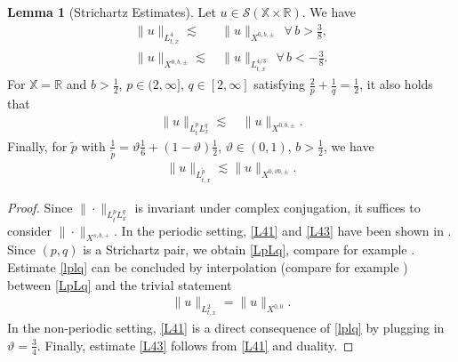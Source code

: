 \documentclass[reqno]{amsart}
\theoremstyle{Definitionl}
\theoremstyle{Definitionk}
\theoremstyle{definition}
\theoremstyle{Satzk}
\theoremstyle{Satzl}
\newtheorem{lemmal}[defi]{Lemma}
\theoremstyle{Bemerkung}
\begin{document}
\begin{lemmal}[Strichartz Estimates]
Let $u\in\mathcal S(\mathbb X\times\mathbb R)$. We have
\begin{align}
\|u\|_{L^4_{t,x}}\lesssim&\, \|u\|_{X^{0,b,\pm}}\ \ \forall\,b>\frac38,\label{L41}\\
\|u\|_{X^{0,b,\pm}}\lesssim&\, \|u\|_{L^{4/3}_{t,x}}\ \ \forall\,b<-\frac38\label{L43}.
\end{align}
For $\mathbb X=\mathbb R$ and $b>\tfrac12$, $p\in(2,\infty]$, $q\in[2,\infty]$ satisfying $\tfrac2p+\tfrac1q=\tfrac12$, it also holds that
\begin{align}
\|u\|_{L^p_tL^q_x}\lesssim&\, \|u\|_{X^{0,b,\pm}}\label{LpLq}.
\end{align}
Finally, for $\tilde p$ with $\tfrac1{\tilde p}= \vartheta\tfrac16+(1-\vartheta)\tfrac12$, $\vartheta\in(0,1)$, $b>\tfrac12$, we have
\begin{align}
\|u\|_{L^{\tilde p}_{t,x}}\lesssim \|u\|_{X^{0,\vartheta b,\pm}}.\label{lplq}
\end{align}
\end{lemmal}
\begin{proof}
Since $\|\cdot\|_{L^p_tL^q_x}$ is invariant under complex conjugation, it suffices to consider $\|\cdot\|_{X^{s,b,+}}$. In the periodic setting, \eqref{L41} and \eqref{L43} have been shown in \cite[Lemma 2.1]{Grn}. Since $(p,q)$ is a Strichartz pair, we obtain \eqref{LpLq}, compare for example \cite[Lemma 2.3]{GTV}. Estimate \eqref{lplq} can be concluded by interpolation (compare for example \cite[Lemma 1.4]{GrnDiss}) between \eqref{LpLq} and the trivial statement
\begin{align*}
\|u\|_{L^2_{t,x}}=\|u\|_{X^{0,0}}.
\end{align*}
In the non-periodic setting, \eqref{L41} is a direct consequence of \eqref{lplq} by plugging in $\vartheta=\tfrac34$. Finally, estimate \eqref{L43} follows from \eqref{L41} and duality.
\end{proof}
\end{document}
